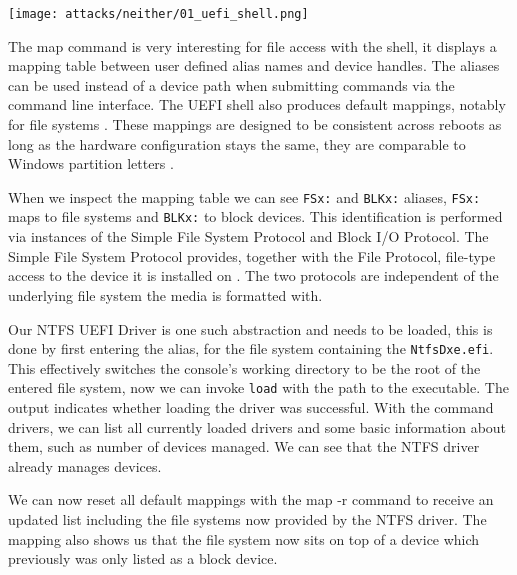 \texttt{[image: attacks/neither/01\_uefi\_shell.png]}


The map command is very interesting for file access with the shell, it displays a mapping table between user defined alias names and device handles. The aliases can be used instead of a device path when submitting commands via the command line interface. The \ac{UEFI} shell also produces default mappings, notably for file systems \cite[3.7.2. Mappings]{uefi-shell-spec}. These mappings are designed to be consistent across reboots as long as the hardware configuration stays the same, they are comparable to Windows partition letters \cite[Appendix A]{uefi-shell-spec}.

When we inspect the mapping table we can see \lstinline{FSx:} and \lstinline{BLKx:} aliases, \lstinline{FSx:} maps to file systems and \lstinline{BLKx:} to block devices. This identification is performed via instances of the Simple File System Protocol and  Block I/O Protocol.
The Simple File System Protocol \cite[13.4 Simple File System Protocol]{uefi-spec} provides, together with the File Protocol, file-type access to the device it is installed on \cite[13.5 File Protocol]{uefi-spec}. The two protocols are independent of the underlying file system the media is formatted with.


Our \ac{NTFS} \ac{UEFI} Driver is one such abstraction and needs to be loaded, this is done by first entering the alias, for the file system containing the \lstinline{NtfsDxe.efi}.
This effectively switches the console's working directory to be the root of the entered file system, now we can invoke \lstinline{load} with the path to the executable. The output indicates whether loading the driver was successful.
With the command drivers, we can list all currently loaded drivers and some basic information about them, such as number of devices managed. We can see that the NTFS driver already manages devices.

We can now reset all default mappings with the map -r command to receive an updated list including the file systems now provided by the \ac{NTFS} driver. The mapping also shows us that the file system now sits on top of a device which previously was only listed as a block device.

